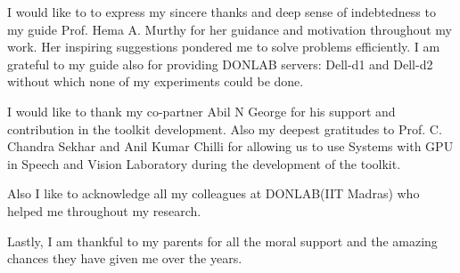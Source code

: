 \acknowledgements
I would like to to express my sincere thanks and deep sense of indebtedness to my guide Prof. Hema A.  Murthy for her guidance and motivation throughout my work.  Her inspiring suggestions pondered me to solve problems efficiently.  I am grateful to my guide also for providing DONLAB servers: Dell-d1 and Dell-d2 without which none of my experiments could be done.

\par I would like to thank my co-partner Abil N George for his support and contribution in the toolkit development.  Also my deepest gratitudes to Prof. C. Chandra Sekhar and Anil Kumar Chilli for allowing us to use Systems with GPU in Speech and Vision Laboratory during the development of the toolkit. 

\par Also I like to acknowledge all my colleagues at DONLAB(IIT Madras) who helped me throughout my research. 
 
\par Lastly, I am thankful to my parents for all the moral support and the amazing chances they have given me over the years.

